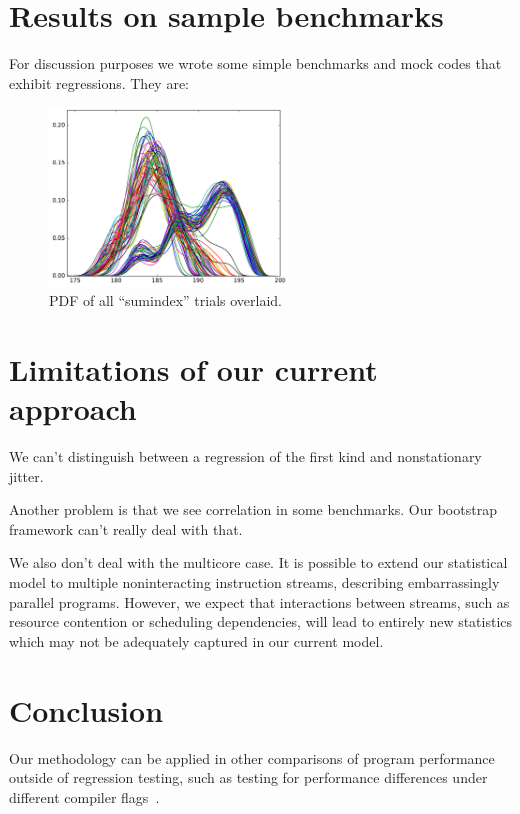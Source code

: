 \documentclass[conference]{IEEEtran}
\begin{document}
\section{Results on sample benchmarks}

For discussion purposes we wrote some simple benchmarks and mock codes that exhibit regressions. They are:




\begin{figure}[!t]
\centering
{}
\includegraphics[width=2.5in]{figures/fig4/kde_pdf_sumindex}
\caption{PDF of all ``sumindex'' trials overlaid.}
\label{fig:pdfsumindex}
\end{figure}


\section{Limitations of our current approach}

We can't distinguish between a regression of the first kind and nonstationary jitter.

Another problem is that we see correlation in some benchmarks. Our bootstrap framework can't really deal with that.

We also don't deal with the multicore case. It is possible to extend our statistical
model to multiple noninteracting instruction streams, describing embarrassingly
parallel programs. However, we expect that interactions between streams, such as
resource contention or scheduling dependencies, will lead to entirely new
statistics which may not be adequately captured in our current model.



\section{Conclusion}

Our methodology can be applied in other comparisons of program performance
outside of regression testing, such as testing for performance differences under different compiler flags~\cite{Mytkowicz2009}.
\end{document}
